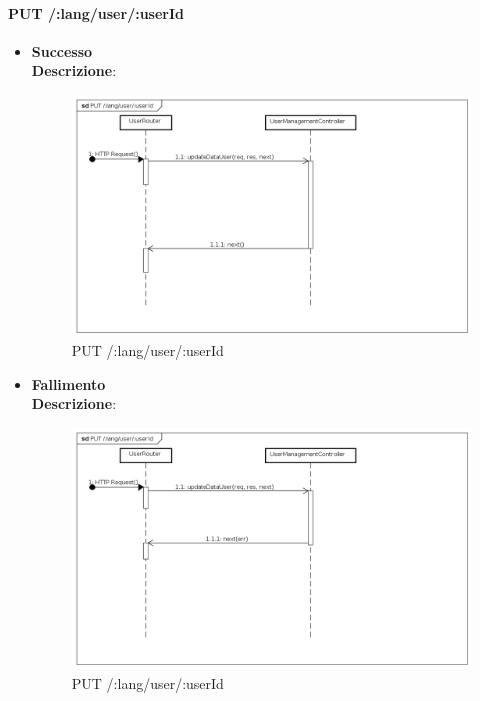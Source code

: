 \paragraph{PUT /:lang/user/:userId}
\begin{itemize}
\item \textbf{Successo}
\\
\textbf{Descrizione}:
\label{Procedura di modifica dati utente}
\begin{figure}[ht]
	\centering
	\includegraphics[scale=0.40]{UML/DiagrammiDiSequenza/Back-end/PUT_LangUserUseridSuccess.png}
	\caption{PUT /:lang/user/:userId}
\end{figure}
\FloatBarrier

\item \textbf{Fallimento}
\\
\textbf{Descrizione}:
\label{Fallimento della procedura di modifica dati utente}
\begin{figure}[ht]
	\centering
	\includegraphics[scale=0.40]{UML/DiagrammiDiSequenza/Back-end/PUT_LangUserUseridFailure.png}
	
	\caption{PUT /:lang/user/:userId}
\end{figure}
\FloatBarrier
\end{itemize}

